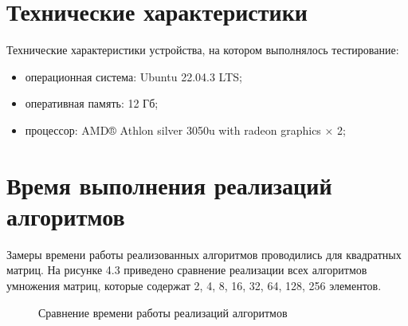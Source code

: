 \section{Технические характеристики}

Технические характеристики устройства, на котором выполнялось тестирование:

\begin{itemize}
	\item операционная система: Ubuntu 22.04.3 LTS;
	\item оперативная память: 12 Гб;
	\item процессор: AMD® Athlon silver 3050u with radeon graphics × 2;
\end{itemize}

\section{Время выполнения реализаций алгоритмов}

Замеры времени работы реализованных алгоритмов проводились для квадратных матриц.
На рисунке 4.3 приведено сравнение реализации всех алгоритмов умножения матриц, которые содержат 2, 4, 8, 16, 32, 64, 128, 256 элементов.
\begin{figure}[ht!]
	\begin{center}
		\captionsetup{singlelinecheck = false, justification=centerfirst}
		\centering
		\caption{Сравнение времени работы реализаций алгоритмов}
		\label{fig:graph1}
	\end{center}
	
\end{figure}


